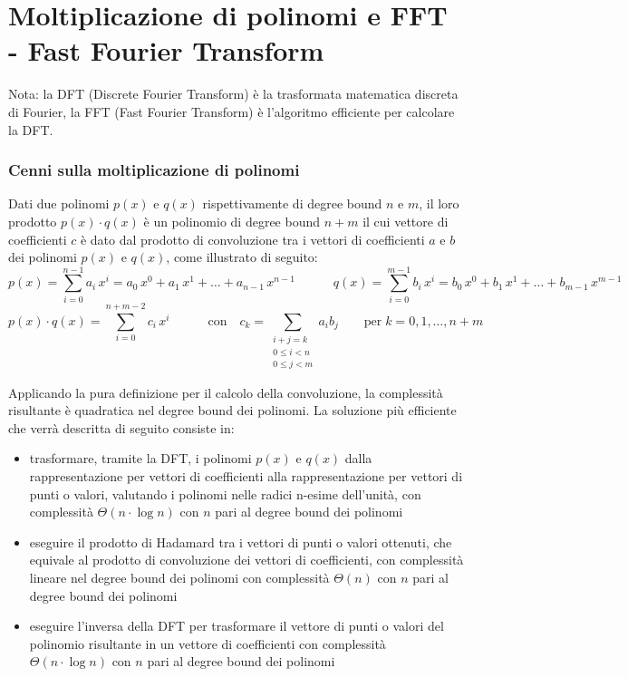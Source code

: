 \section{Moltiplicazione di polinomi e FFT - Fast Fourier Transform}
{
	\footnotesize Nota: la DFT (Discrete Fourier Transform) è la trasformata matematica discreta di Fourier, la FFT (Fast Fourier
	Transform) è l'algoritmo efficiente per calcolare la DFT.
}

\subsubsection*{Cenni sulla moltiplicazione di polinomi}
Dati due polinomi \(p(x)\) e \(q(x)\) rispettivamente di degree bound \(n\) e \(m\), il loro prodotto \(p(x) \cdot q(x)\)
è un polinomio di degree bound \(n + m\) il cui vettore di coefficienti \(c\) è dato dal prodotto di convoluzione tra i vettori
di coefficienti \(a\) e \(b\) dei polinomi \(p(x)\) e \(q(x)\), come illustrato di seguito:
\[p(x) = \sum_{i=0}^{n-1} a_i \, x^i = a_0 \, x^0 + a_1 \, x^1 + \dots + a_{n-1} \, x^{n-1} \qquad\quad q(x) = \sum_{i=0}^{m-1} b_i \, x^i = b_0 \, x^0 + b_1 \, x^1 + \dots + b_{m-1} \, x^{m-1}\]
\[p(x) \cdot q(x) = \sum_{i=0}^{n+m-2} c_i \, x^i \qquad\quad \text{con} \quad c_k = \!\! \sum_{\substack{i+j=k \\[2pt] 0 \leq i < n \\[2pt] 0 \leq j < m}} \!\! a_i b_j \qquad \text{per} \; k = 0, 1, \dotsc, n + m\]

\noindent
Applicando la pura definizione per il calcolo della convoluzione, la complessità risultante è quadratica nel degree bound dei
polinomi. La soluzione più efficiente che verrà descritta di seguito consiste in:
\begin{itemize}
	\item trasformare, tramite la DFT, i polinomi \(p(x)\) e \(q(x)\) dalla rappresentazione per vettori di coefficienti
	alla rappresentazione per vettori di punti o valori, valutando i polinomi nelle radici n-esime dell'unità, con complessità
	\(\Theta(n \cdot \log n)\) con \(n\) pari al degree bound dei polinomi
	\item eseguire il prodotto di Hadamard tra i vettori di punti o valori ottenuti, che equivale al prodotto di convoluzione
	dei vettori di coefficienti, con complessità lineare nel degree bound dei polinomi con complessità \(\Theta(n)\) con \(n\)
	pari al degree bound dei polinomi
	\item eseguire l'inversa della DFT per trasformare il vettore di punti o valori del polinomio risultante in un vettore
	di coefficienti con complessità \(\Theta(n \cdot \log n)\) con \(n\) pari al degree bound dei polinomi
\end{itemize}

